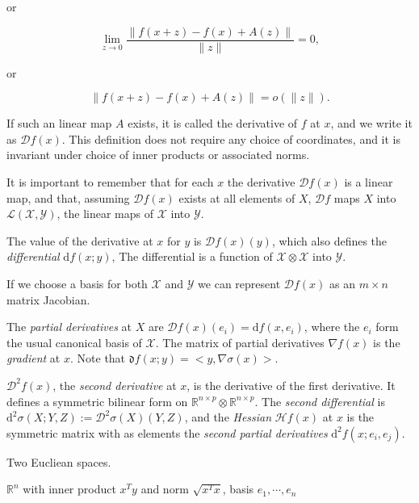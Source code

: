 \documentclass[
  12pt,
]{book}
\theoremstyle{definition}
\theoremstyle{definition}
\theoremstyle{definition}
\theoremstyle{definition}
\theoremstyle{remark}
\begin{document}
or

\begin{equation}
\lim_{z\rightarrow 0}\frac{\|f(x+z)-f(x)+A(z)\|}{\|z\|}=0,
\label{eq:proptangent2}
\end{equation}

or

\begin{equation}
\|f(x+z)-f(x)+A(z)\|=o(\|z\|).
\label{eq:proptangent3}
\end{equation}

If such an linear map \(A\) exists, it is called the derivative of \(f\) at \(x\), and we write it as \(\mathcal{D}f(x)\). This definition does not require any choice of coordinates, and it is invariant under choice of inner products or associated norms.

It is important to remember that for each \(x\) the derivative \(\mathcal{D}f(x)\) is a linear map, and that, assuming \(\mathcal{D}f(x)\) exists at all elements of \(X\), \(\mathcal{D}f\) maps \(X\) into \(\mathcal{L}(\mathcal{X},\mathcal{Y})\), the linear maps of \(\mathcal{X}\) into \(\mathcal{Y}\).

The value of the derivative at \(x\) for \(y\) is
\(\mathcal{D}f(x)(y)\), which also defines the \emph{differential} \(\mathrm{d}f(x;y)\), The differential is a function of \(\mathcal{X}\otimes\mathcal{X}\) into \(\mathcal{Y}\).

If we choose a basis for both \(\mathcal{X}\) and \(\mathcal{Y}\) we can represent \(\mathcal{D}f(x)\) as an \(m\times n\) matrix Jacobian.

The \emph{partial derivatives} at \(X\) are \(\mathcal{D}f(x)(e_i)=\mathrm{d}f(x,e_i)\), where the \(e_i\) form the usual canonical basis of \(\mathcal{X}\). The matrix of partial derivatives \(\nabla f(x)\) is the \emph{gradient} at \(x\). Note that \(\mathfrak{d}f(x;y)=<y,\nabla\sigma(x)>\).

\(\mathcal{D}^2f(x)\), the \emph{second derivative} at \(x\), is the derivative of the first derivative. It defines a symmetric bilinear form on \(\mathbb{R}^{n\times p}\otimes\mathbb{R}^{n\times p}\). The \emph{second differential} is \(\mathrm{d}^2\sigma(X;Y,Z):=\mathcal{D}^2\sigma(X)(Y,Z)\), and the \emph{Hessian} \(\mathcal{H}f(x)\) at \(x\) is the
symmetric matrix with as elements the \emph{second partial derivatives} \(\mathrm{d}^2f(x;e_i,e_j)\).

Two Eucliean spaces.

\(\mathbb{R}^n\) with inner product \(x^Ty\) and norm \(\sqrt{x^Tx}\), basis \(e_1,\cdots,e_n\)
\end{document}

